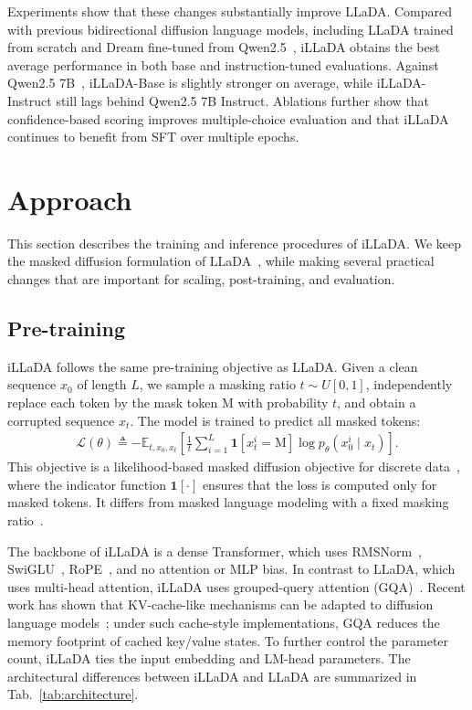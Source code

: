 \documentclass[]{bytedance_seed}
\begin{document}
Experiments show that these changes substantially improve LLaDA. Compared with previous bidirectional diffusion language models, including LLaDA trained from scratch and Dream fine-tuned from Qwen2.5~\citep{ye2025dream}, iLLaDA obtains the best average performance in both base and instruction-tuned evaluations. Against Qwen2.5 7B~\citep{qwen2.5}, iLLaDA-Base is slightly stronger on average, while iLLaDA-Instruct still lags behind Qwen2.5 7B Instruct. Ablations further show that confidence-based scoring improves multiple-choice evaluation and that iLLaDA continues to benefit from SFT over multiple epochs.

\section{Approach}
\label{sec:approach}

This section describes the training and inference procedures of iLLaDA. We keep the masked diffusion formulation of LLaDA~\citep{austin2021structured,lou2023discrete,shi2024simplified,sahoo2024simple,ou2024your,nie2026large}, while making several practical changes that are important for scaling, post-training, and evaluation.

\subsection{Pre-training}
\label{sec:pretraining}

iLLaDA follows the same pre-training objective as LLaDA. Given a clean sequence \(x_0\) of length \(L\), we sample a masking ratio \(t \sim U[0, 1]\), independently replace each token by the mask token \(\textrm{M}\) with probability \(t\), and obtain a corrupted sequence \(x_t\). The model is trained to predict all masked tokens:
\begin{align}
\label{eq:pretrain-objective}
   \mathcal{L}(\theta)
   \triangleq
   -\mathbb{E}_{t, x_0, x_t}
   \left[
   \frac{1}{t}
   \sum_{i=1}^{L}
   \textbf{1}[x_t^i = \textrm{M}]
   \log p_{\theta}(x_0^i \mid x_t)
   \right].
\end{align}
This objective is a likelihood-based masked diffusion objective for discrete data~\citep{shi2024simplified,sahoo2024simple,ou2024your}, where the indicator function $\textbf{1}[\cdot]$ ensures that the loss is computed only for masked tokens. It differs from masked language modeling with a fixed masking ratio~\citep{devlin2018bert}.

The backbone of iLLaDA is a dense Transformer, which uses RMSNorm~\citep{zhang2019root}, SwiGLU~\citep{shazeer2020glu}, RoPE~\citep{su2024roformer}, and no attention or MLP bias. In contrast to LLaDA, which uses multi-head attention, iLLaDA uses grouped-query attention (GQA)~\citep{ainslie2023gqa}. Recent work has shown that KV-cache-like mechanisms can be adapted to diffusion language models~\citep{ma2025dkvcache,nguyentri2025attention,cheong2026entropycache,yang2025diffusionvar,qian2026d3llm}; under such cache-style implementations, GQA reduces the memory footprint of cached key/value states. To further control the parameter count, iLLaDA ties the input embedding and LM-head parameters. The architectural differences between iLLaDA and LLaDA are summarized in Tab.~\ref{tab:architecture}.
\end{document}
